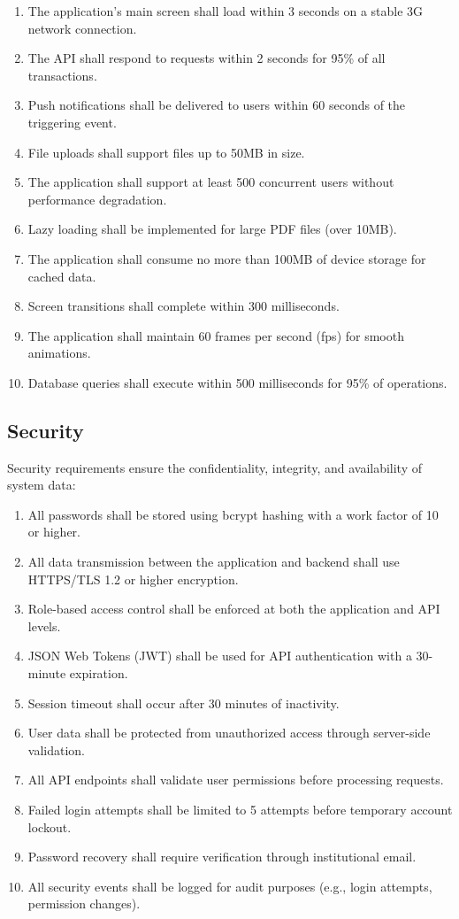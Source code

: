 \documentclass[12pt,a4paper]{article}
\begin{document}
\begin{enumerate}[leftmargin=*, label=\textbf{PE-\arabic*.}, itemsep=4pt]
  \item The application's main screen shall load within 3 seconds on a stable 3G network connection.
  \item The API shall respond to requests within 2 seconds for 95\% of all transactions.
  \item Push notifications shall be delivered to users within 60 seconds of the triggering event.
  \item File uploads shall support files up to 50MB in size.
  \item The application shall support at least 500 concurrent users without performance degradation.
  \item Lazy loading shall be implemented for large PDF files (over 10MB).
  \item The application shall consume no more than 100MB of device storage for cached data.
  \item Screen transitions shall complete within 300 milliseconds.
  \item The application shall maintain 60 frames per second (fps) for smooth animations.
  \item Database queries shall execute within 500 milliseconds for 95\% of operations.
\end{enumerate}

\subsection{Security}

Security requirements ensure the confidentiality, integrity, and availability of system data:

\begin{enumerate}[leftmargin=*, label=\textbf{SE-\arabic*.}, itemsep=4pt]
  \item All passwords shall be stored using bcrypt hashing with a work factor of 10 or higher.
  \item All data transmission between the application and backend shall use HTTPS/TLS 1.2 or higher encryption.
  \item Role-based access control shall be enforced at both the application and API levels.
  \item JSON Web Tokens (JWT) shall be used for API authentication with a 30-minute expiration.
  \item Session timeout shall occur after 30 minutes of inactivity.
  \item User data shall be protected from unauthorized access through server-side validation.
  \item All API endpoints shall validate user permissions before processing requests.
  \item Failed login attempts shall be limited to 5 attempts before temporary account lockout.
  \item Password recovery shall require verification through institutional email.
  \item All security events shall be logged for audit purposes (e.g., login attempts, permission changes).
\end{enumerate}
\end{document}
